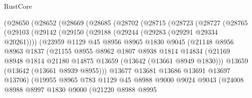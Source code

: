 \begin{lexlean}{RustCore}
\begin{coremodule}
        (@28650
          (@28652
            (@28669
              (@28685
                (@28702
                  (@28715
                    (@28723
                      (@28727
                        (@28765
                          (@29103
                            (@29142
                              (@29150
                                (@29188 (@29244 (@29283 (@29291 @29334 @20261))))
                                (@23959
                                  @1129
                                  @45
                                  @8956
                                  @8965
                                  @1830
                                  @9045
                                  (@21148
                                    @8956
                                    @8963
                                    @1837
                                    (@21155
                                      @8955
                                      @8962
                                      @1807
                                      @8938
                                      @1814
                                      @14834
                                      (@21169
                                        @8948
                                        @1814
                                        @21180
                                        @14875
                                        @13659
                                        (@13642 (@13661 @8949 @1830)))
                                      @13659
                                      (@13642 (@13661 @8939 @8955)))
                                    @13677
                                    @13681
                                    @13686
                                    @13691
                                    @13697
                                    @13706)
                                  (@19955
                                    @8965
                                    @783
                                    @1129
                                    @45
                                    @8988
                                    @9000
                                    @9024
                                    @9043
                                    (@24008
                                      @8988
                                      @8997
                                      @1830
                                      @9000
                                      (@21220
                                        @8988
                                        @8995

\end{coremodule}
\end{lexlean}

